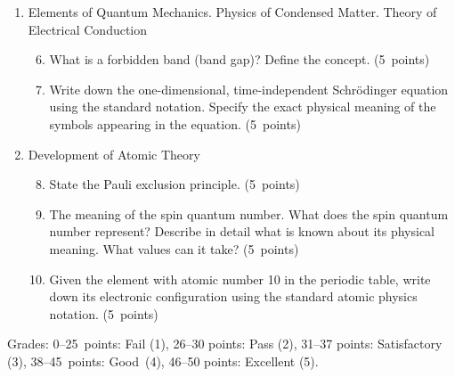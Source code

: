 \documentclass[a4paper,12pt]{letter}
\begin{document}
\begin{enumerate}[label=\Roman*.]

\item Elements of Quantum Mechanics. Physics of Condensed Matter. Theory of Electrical Conduction

\begin{enumerate}[label=\arabic*.]
\setcounter{enumii}{5} %
  
\item What is a forbidden band (band gap)? Define the concept. \hfill (5~points)

\item Write down the one-dimensional, time-independent Schrödinger equation using the standard notation. Specify the exact physical meaning of the symbols appearing in the equation. \hfill (5~points)

\end{enumerate}

  
\item Development of Atomic Theory

\begin{enumerate}[label=\arabic*.]
\setcounter{enumii}{7} %

\item State the Pauli exclusion principle. \hfill (5~points)

\item The meaning of the spin quantum number. What does the spin quantum number represent? Describe in detail what is known about its physical meaning. What values can it take? \hfill (5~points)

\item Given the element with atomic number 10 in the periodic table, write down its electronic configuration using the standard atomic physics notation. \hfill (5~points)
  
\end{enumerate}

\end{enumerate}


Grades: 0–25~points: Fail (1), 26–30 points: Pass (2), 31–37 points: Satisfactory (3), 38–45~points: Good~(4), 46–50 points: Excellent (5).


\vfill
\end{document}
